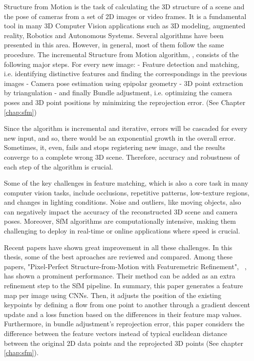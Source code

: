 \documentclass[11pt]{article}
\begin{document}
    Structure from Motion is the task of calculating the 3D structure of a scene and the pose of cameras from
    a set of 2D images or video frames.
    It is a fundamental tool in many 3D Computer Vision applications such as 3D modeling, augmented reality,
    Robotics and Autonomous Systems.
    Several algorithms have been presented in this area. However, in general, most of them follow the same procedure.
    The incremental Structure from Motion algorithm, \cite{schoenberger2016sfm}, consists of the following major steps.
    For every new image: - Feature detection and matching, i.e. identifying distinctive features and finding the
    correspondings in the previous images - Camera pose estimation using epipolar geometry - 3D point extraction
    by triangulation - and finally Bundle adjustment, i.e. optimizing the camera poses and 3D point positions by
    minimizing the reprojection error. (See Chapter \ref{chap:sfm})

    Since the algorithm is incremental and iterative, errors will be cascaded for every new input, and so, there would be
    an exponential growth in the overall error. Sometimes, it, even, fails and stops registering new image,
    and the results converge to a complete wrong 3D scene. Therefore, accuracy and robustness of each step of
    the algorithm is crucial.

    Some of the key challenges in feature matching, which is also a core task in many computer vision tasks,
    include occlusions, repetitive patterns, low-texture regions, and changes in lighting conditions.
    Noise and outliers, like moving objects, also can negatively impact the accuracy
    of the reconstructed 3D scene and camera poses. Moreover, SfM algorithms are computationally intensive,
    making them challenging to deploy in real-time or online applications where speed is crucial.

    Recent papers have shown great improvement in all these challenges. In this thesis, some of the best aproaches are
    reviewed and compared. Among these papers, "Pixel-Perfect Structure-from-Motion with Featuremetric Refinement",
    ~\cite{lindenberger2021pixsfm}, has shown a prominent performance. Their method can be added as an extra refinement
    step to the SfM pipeline. In summary, this paper generates
    a feature map per image using CNNs. Then, it adjusts the position of the existing keypoints by defining a flow
    from one point to another through a gradient descent update and a loss function based on the differences in their
    feature map values.
    Furthermore, in bundle adjustment's reprojection error, this paper considers the difference between the
    feature vectors instead of typical euclidean distance between the original 2D data points and the reprojected
    3D points (See chapter \ref{chap:sfm}).
\end{document}
